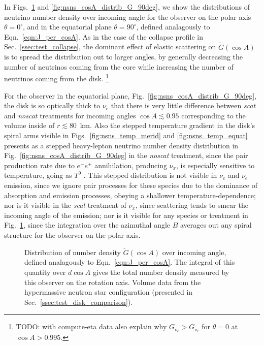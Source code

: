 \documentclass[aps,floatfix,prd,superscriptaddress,twocolumn]{revtex4-1}
\begin{document}
In Figs.~\ref{fig:nsns_cosA_distrib_G_00deg}
and \ref{fig:nsns_cosA_distrib_G_90deg}, we show the distributions of neutrino
number density over incoming angle
for the observer on the polar axis $\theta=0^\circ$,
and in the equatorial plane $\theta=90^\circ$,
defined analagously to Eqn.~\ref{eqn:J_per_cosA}.
As in the case of the collapse profile in Sec.~\ref{ssec:test_collapse},
the dominant effect of elastic scattering on $\tilde{G}(\cos A)$
is to spread the distribution out to larger angles, by generally decreasing
the number of neutrinos coming from the core while increasing the number
of neutrinos coming from the disk.
\footnote{TODO: with compute-eta data also explain why $G_{\nu_e}>G_{\bar{\nu}_e}$
  for $\theta=0$ at $\cos A>0.995$.}

For the observer in the equatorial plane,
Fig.~\ref{fig:nsns_cosA_distrib_G_90deg}, the disk is so optically thick to
$\nu_e$ that there is very little difference between \emph{scat} and
\emph{noscat} treatments for incoming angles $\cos A \lesssim 0.95$
corresponding to the volume inside of $r \lesssim 80$~km.
Also the stepped temperature gradient in the disk's spiral arms visible in
Figs.~\ref{fig:nsns_temp_merid} and \ref{fig:nsns_temp_equat} presents as a
stepped heavy-lepton neutrino number density distribution in
Fig.~\ref{fig:nsns_cosA_distrib_G_90deg} in the \emph{noscat} treatment,
since the pair production rate due to $e^{-}e^{+}$ annihilation,
producing $\nu_x$, is especially sensitive to temperature, going as
$T^9$ \cite[Sec.~7]{burr2006-neutrino_opacities}.
This stepped distribution is not visible in $\nu_e$ and $\bar{\nu}_e$ emission,
since we ignore pair processes for these species due to the dominance of
absorption and emission processes, obeying a shallower temperature-dependence;
nor is it visible in the \emph{scat} treatment of $\nu_x$, since scattering
tends to smear the incoming angle of the emission;
nor is it visible for any species or treatment in
Fig.~\ref{fig:nsns_cosA_distrib_G_00deg}, since the integration over the
azimuthal angle $B$ averages out any spiral structure for the observer
on the polar axis.

\begin{figure}
  \resizebox{\columnwidth}{!}{}
  \caption{Distribution of number density $\tilde{G}(\cos A)$ over incoming angle,
    defined analagously to Eqn.~\ref{eqn:J_per_cosA}.
    The integral of this quantity over $d\cos A$ gives the total number density
    measured by this observer on the rotation axis.
    Volume data from the hypermassive neutron star configuration
    (presented in Sec.~\ref{ssec:test_disk_comparison}).}
  \label{fig:nsns_cosA_distrib_G_00deg}
\end{figure}
\end{document}
